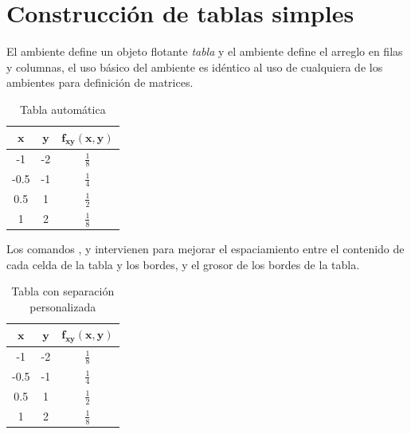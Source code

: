 \documentclass{article}
\begin{document}
\section{Construcción de tablas simples}

El ambiente  define un objeto flotante \emph{tabla} y el ambiente  define el arreglo en filas y columnas, el uso básico del ambiente  es idéntico al uso de cualquiera de los ambientes para definición de matrices.

\begin{table}
	\centering
    \begin{tabular}{ccc}
    	$\mathbf{x}$ & $\mathbf{y}$ & $\mathbf{f_{xy}(x, y)}$ \\
        \hline
        -1 & -2 & $\frac{1}{8}$ \\
        -0.5 & -1 & $\frac{1}{4}$ \\
        0.5 & 1 & $\frac{1}{2}$ \\
        1 & 2 & $\frac{1}{8}$ \\
        \hline
    \end{tabular}
    \caption{Tabla automática}
\end{table}

\textcolor{gray!95}{\lipsum[1]}

Los comandos ,  y  intervienen para mejorar el espaciamiento entre el contenido de cada celda de la tabla y los bordes, y el grosor de los bordes de la tabla.

\renewcommand{\tabcolsep}{3mm}
\renewcommand{\arraystretch}{1.5}
\renewcommand{\arrayrulewidth}{1pt}
\begin{table}[ht]
	\centering
    \begin{tabular}{ccc}
    	$\mathbf{x}$ & $\mathbf{y}$ & $\mathbf{f_{xy}(x, y)}$ \\
        \hline
        -1 & -2 & $\frac{1}{8}$ \\
        -0.5 & -1 & $\frac{1}{4}$ \\
        0.5 & 1 & $\frac{1}{2}$ \\
        1 & 2 & $\frac{1}{8}$ \\
        \hline
    \end{tabular}
    \caption{Tabla con separación personalizada}
\end{table}
\end{document}
